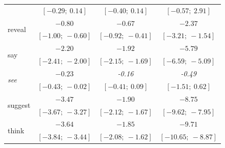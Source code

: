 \documentclass[11pt,fleqn]{article}
\newcommand{\6}{\mbox{$[\hspace*{-.6mm}[$}}
\newcommand{\9}{\mbox{$]\hspace*{-.6mm}]$}}
\begin{document}
\begin{table}
\begin{center}
\begin{tabular}{l c c c}
                        & $[-0.29;\ 0.14]$  & $[-0.40;\ 0.14]$  & $[-0.57;\ 2.91]$    \\
\multirow{2}{*}{reveal}           & $-0.80$       & $-0.67$       & $-2.37$         \\
                        & $[-1.00;\ -0.60]$ & $[-0.92;\ -0.41]$ & $[-3.21;\ -1.54]$   \\
\multirow{2}{*}{say}              & $-2.20$       & $-1.92$       & $-5.79$         \\
                        & $[-2.41;\ -2.00]$ & $[-2.15;\ -1.69]$ & $[-6.59;\ -5.09]$   \\
\multirow{2}{*}{\emph{see}}              & $-0.23$       & \emph{-0.16}           & \emph{-0.49}             \\
                        & $[-0.43;\ -0.02]$ & $[-0.41;\ 0.09]$  & $[-1.51;\ 0.62]$    \\
\multirow{2}{*}{suggest}          & $-3.47$       & $-1.90$       & $-8.75$         \\
                        & $[-3.67;\ -3.27]$ & $[-2.12;\ -1.67]$ & $[-9.62;\ -7.95]$   \\
\multirow{2}{*}{think}            & $-3.64$       & $-1.85$       & $-9.71$         \\
                        & $[-3.84;\ -3.44]$ & $[-2.08;\ -1.62]$ & $[-10.65;\ -8.87]$  \\
\bottomrule
\end{tabular}
\label{tab:exp2modelresults}
\end{center}
\end{table}

\normalsize
\end{document}
